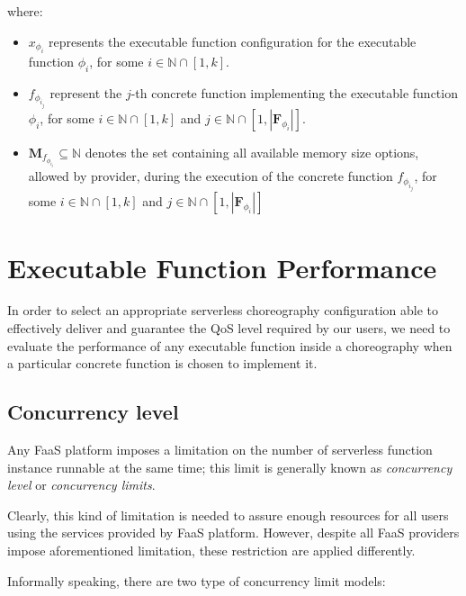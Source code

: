 \documentclass[12pt,a4paper]{report}
\newcommand*{\N}{\mathbb{N}}
\theoremstyle{definition}
\begin{document}
where:

\begin{itemize}
	\item $x_{\phi_{i}}$ represents the executable function configuration for the executable function $\phi_{i}$, for some  $i \in \N \cap \left[ 1, k \right]$.
	
	\item $f_{\phi_{i_j}}$ represent the $j$-th concrete function implementing the executable function $\phi_{i}$, for some  $i \in \N \cap \left[ 1, k \right]$ and $j \in \N \cap \left[ 1, |\textbf{F}_{\phi_{i}}| \right]$.
	
	\item $\textbf{M}_{f_{\phi_{i_j}}} \subseteq \N$ denotes the set containing all available memory size options, allowed by provider, during the execution of the concrete function $f_{\phi_{i_j}}$, for some $i \in \N \cap \left[ 1, k \right]$ and $j \in \N \cap \left[ 1, |\textbf{F}_{\phi_{i}}| \right]$
\end{itemize}

\section{Executable Function Performance}

In order to select an appropriate serverless choreography configuration able to effectively deliver and guarantee the QoS level required by our users, we need to evaluate the performance of any executable function inside a choreography when a particular concrete function is chosen to implement it. 

\subsection{Concurrency level}

Any FaaS platform imposes a limitation on the number of serverless function instance runnable at the same time; this limit is generally known as \textit{concurrency level} or \textit{concurrency limits}. 

Clearly, this kind of limitation is needed to assure enough resources for all users using the services provided by FaaS platform. However, despite all FaaS providers impose aforementioned limitation, these restriction are applied differently.

Informally speaking, there are two type of concurrency limit models:
\end{document}

